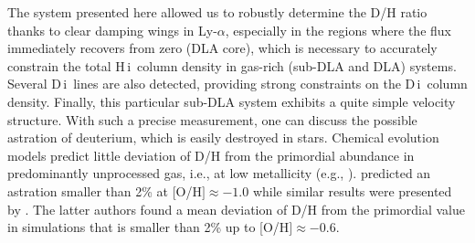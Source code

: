 \documentclass[fleqn,usenatbib]{mnras}
\newcommand{\PK}[1]{{\color{cyan} PK:~ #1}}
\newcommand{\PN}[2][]{{\color{orange} PN:\st{#1}~#2}}  %
\newcommand{\DI}[0]{D\,{\sc i}}
\newcommand{\HI}[0]{H\,{\sc i}}
\begin{document}
The system presented here allowed us to robustly determine the D/H ratio thanks to clear damping wings in Ly-$\alpha$, especially in the regions where the flux immediately recovers from zero (DLA core), which is necessary to accurately constrain the total \HI\ column density in gas-rich (sub-DLA and DLA) systems. Several \DI\ lines are also detected, providing strong constraints on the \DI\ column density. Finally, this particular sub-DLA system exhibits a quite simple velocity structure.
With such a precise measurement, one can discuss the possible astration of deuterium, which is easily destroyed in stars.
Chemical evolution models predict little deviation of D/H from the primordial abundance in predominantly unprocessed gas, i.e., at low metallicity (e.g., \citealt{Dvorkin_2016}). \cite{Weinberg_2016} predicted an astration smaller than 2\% at [O/H$]\approx -1.0$ while similar results were presented by \cite{Van_de_voort_2018}. The latter authors found a mean deviation of D/H from the primordial value in simulations that is smaller than 2\% up to [O/H$]\approx -0.6$.
\end{document}
